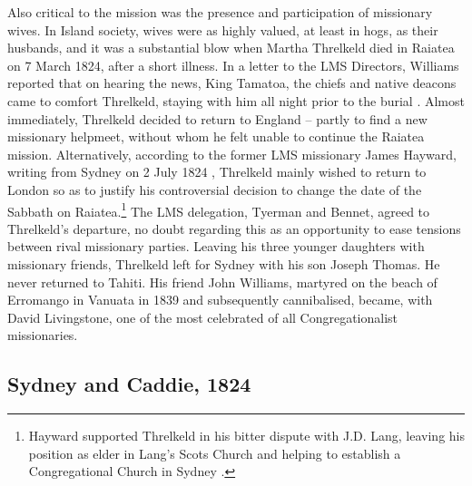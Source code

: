 Also critical to the mission was the presence and participation of missionary wives. In Island society, wives were as highly valued, at least in hogs, as their husbands, and it was a substantial blow when Martha Threlkeld died in Raiatea on 7 March 1824, after a short illness. In a letter to the LMS Directors, Williams reported that on hearing the news, King Tamatoa, the chiefs and native deacons came to comfort Threlkeld, staying with him all night prior to the burial \citep[139]{prout_memoirs_1843}. Almost immediately, Threlkeld decided to return to England -- partly to find a new missionary helpmeet, without whom he felt unable to continue the Raiatea mission. Alternatively, according to the former LMS missionary James Hayward, writing from Sydney on 2 July 1824 \citep[box 2/ folder 2]{lms_australia_1798-1968}, Threlkeld mainly wished to return to London so as to justify his controversial decision to change the date of the Sabbath on Raiatea.\footnote{Hayward supported Threlkeld in his bitter dispute with J.D. Lang, leaving his position as elder in Lang’s Scots Church and helping to establish a Congregational Church in Sydney \citep[325]{gunson_australian_1974b}.} The LMS delegation, Tyerman and Bennet, agreed to Threlkeld’s departure, no doubt regarding this as an opportunity to ease tensions between rival missionary parties. Leaving his three younger daughters with missionary friends, Threlkeld left for Sydney with his son Joseph Thomas. He never returned to Tahiti. His friend John Williams, martyred on the beach of Erromango in Vanuata in 1839 and subsequently cannibalised, became, with David Livingstone, one of the most celebrated of all Congregationalist missionaries.

\subsection{Sydney and Caddie, 1824}

